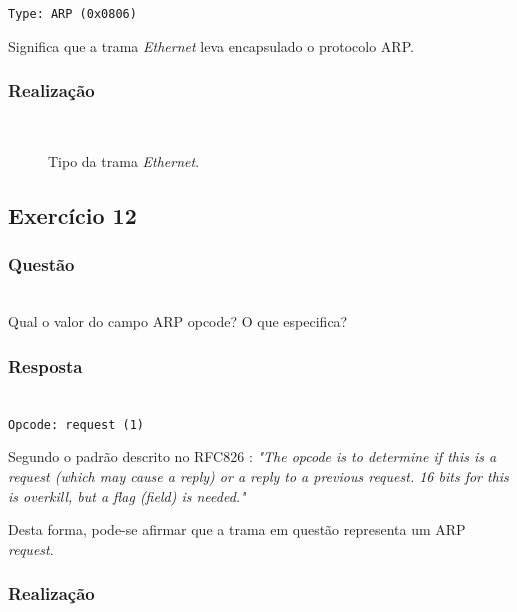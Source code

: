\documentclass{llncs}
\begin{document}
\texttt{Type: ARP (0x0806)} 

Significa que a trama \textit{Ethernet} leva encapsulado o protocolo ARP.

\subsubsection{Realização}\rule[-10pt]{0pt}{10pt}\\

\begin{figure}
	\caption{Tipo da trama \textit{Ethernet}.}
	\label{fig:arp_request_type}
\end{figure} 


\clearpage
\subsection{Exercício 12}
\subsubsection{Questão}\rule[-10pt]{0pt}{10pt}\\

Qual o valor do campo ARP opcode? O que especifica?

\subsubsection{Resposta}\rule[-10pt]{0pt}{10pt}\\

\texttt{Opcode: request (1)}

Segundo o padrão descrito no RFC826 \cite{RFC0826}:
	\emph{"The opcode is to determine if this is a request (which may cause a reply) or a reply to a previous request.  16 bits for this is overkill, but a flag (field) is needed."}

Desta forma, pode-se afirmar que a trama em questão representa um ARP \textit{request}.

\subsubsection{Realização}\rule[-10pt]{0pt}{10pt}\\
\end{document}
